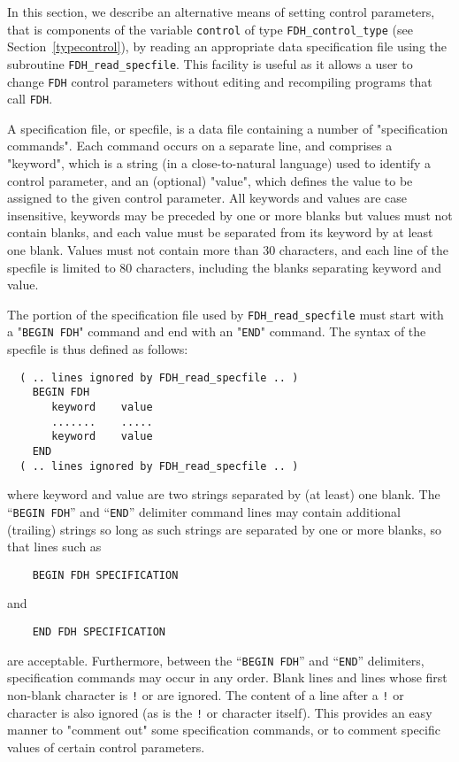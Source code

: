 \documentclass{galahad}
\newcommand{\packagename}{FDH}
\begin{document}

\galfeatures
\noindent In this section, we describe an alternative means of setting
control parameters, that is components of the variable {\tt control} of type
{\tt \packagename\_control\_type}
(see Section~\ref{typecontrol}),
by reading an appropriate data specification file using the
subroutine {\tt \packagename\_read\_specfile}. This facility
is useful as it allows a user to change  {\tt \packagename} control parameters
without editing and recompiling programs that call {\tt \packagename}.

A specification file, or specfile, is a data file containing a number of
"specification commands". Each command occurs on a separate line,
and comprises a "keyword",
which is a string (in a close-to-natural language) used to identify a
control parameter, and
an (optional) "value", which defines the value to be assigned to the given
control parameter. All keywords and values are case insensitive,
keywords may be preceded by one or more blanks but
values must not contain blanks, and
each value must be separated from its keyword by at least one blank.
Values must not contain more than 30 characters, and
each line of the specfile is limited to 80 characters,
including the blanks separating keyword and value.

The portion of the specification file used by
{\tt \packagename\_read\_specfile}
must start
with a "{\tt BEGIN \packagename}" command and end with an
"{\tt END}" command.  The syntax of the specfile is thus defined as follows:
\begin{verbatim}
  ( .. lines ignored by FDH_read_specfile .. )
    BEGIN FDH
       keyword    value
       .......    .....
       keyword    value
    END
  ( .. lines ignored by FDH_read_specfile .. )
\end{verbatim}
where keyword and value are two strings separated by (at least) one blank.
The ``{\tt BEGIN \packagename}'' and ``{\tt END}'' delimiter command lines
may contain additional (trailing) strings so long as such strings are
separated by one or more blanks, so that lines such as
\begin{verbatim}
    BEGIN FDH SPECIFICATION
\end{verbatim}
and
\begin{verbatim}
    END FDH SPECIFICATION
\end{verbatim}
are acceptable. Furthermore,
between the
``{\tt BEGIN \packagename}'' and ``{\tt END}'' delimiters,
specification commands may occur in any order.  Blank lines and
lines whose first non-blank character is {\tt !} or {\tt *} are ignored.
The content
of a line after a {\tt !} or {\tt *} character is also
ignored (as is the {\tt !} or {\tt *}
character itself). This provides an easy manner to "comment out" some
specification commands, or to comment specific values
of certain control parameters.
\end{document}
